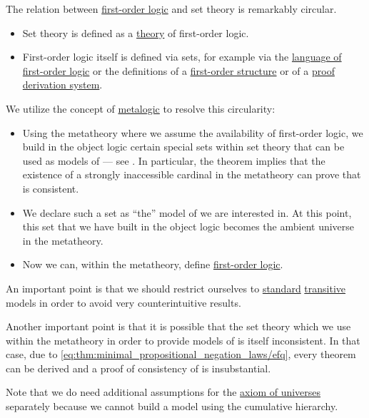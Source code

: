 \begin{remark}\label{rem:set_definition_recursion}
  The relation between \hyperref[subsec:first_order_logic]{first-order logic} and set theory is remarkably circular.

  \begin{itemize}
    \item Set theory is defined as a \hyperref[first_order_theory]{theory} of first-order logic.

    \item First-order logic itself is defined via sets, for example via the \hyperref[def:first_order_language]{language of first-order logic} or the definitions of a \hyperref[def:first_order_structure]{first-order structure} or of a \hyperref[def:proof_derivation_system]{proof derivation system}.
  \end{itemize}

  We utilize the concept of \hyperref[rem:metalogic]{metalogic} to resolve this circularity:
  \begin{itemize}
    \item Using the metatheory where we assume the availability of first-order logic, we build in the object logic certain special sets within set theory that can be used as models of  --- see . In particular, the theorem implies that the existence of a strongly inaccessible cardinal in the metatheory can prove that  is consistent.

    \item We declare such a set as \enquote{the} model of  we are interested in. At this point, this set that we have built in the object logic becomes the ambient universe in the metatheory.

    \item Now we can, within the metatheory, define \hyperref[subsec:first_order_logic]{first-order logic}.
  \end{itemize}

  An important point is that we should restrict ourselves to \hyperref[rem:standard_model_of_set_theory]{standard} \hyperref[rem:transitive_model_of_set_theory]{transitive} models in order to avoid very counterintuitive results.

  Another important point is that it is possible that the set theory which we use within the metatheory in order to provide models of  is itself inconsistent. In that case, due to \eqref{eq:thm:minimal_propositional_negation_laws/efq}, every theorem can be derived and a proof of consistency of  is insubstantial.

  Note that we do need additional assumptions for the \hyperref[def:axiom_of_universes]{axiom of universes} separately because we cannot build a model using the cumulative hierarchy.
\end{remark}

